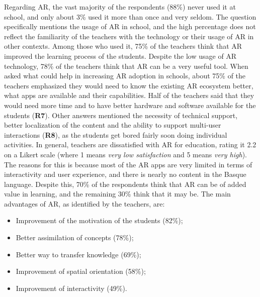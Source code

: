 Regarding AR, the vast majority of the respondents (88\%) never used it at school, and only about 3\% used it more than once and very seldom. The question specifically mentions the usage of AR in school, and the high percentage does not reflect the familiarity of the teachers with the technology or their usage of AR in other contexts. Among those who used it, 75\% of the teachers think that AR improved the learning process of the students. Despite the low usage of AR technology, 78\% of the teachers think that AR can be a very useful tool. When asked what could help in increasing AR adoption in schools, about 75\% of the teachers emphasized they would need to know the existing AR ecosystem better, what apps are available and their capabilities. Half of the teachers said that they would need more time and to have better hardware and software available for the students (\textbf{R7}). Other answers mentioned the necessity of technical support, better localization of the content and the ability to support multi-user interactions (\textbf{R8}), as the students get bored fairly soon doing individual activities. In general, teachers are dissatisfied with AR for education, rating it 2.2 on a Likert scale (where 1 means \textit{very low satisfaction} and 5 means \textit{very high}). The reasons for this is because most of the AR apps are very limited in terms of interactivity and user experience, and there is nearly no content in the Basque language. Despite this, 70\% of the respondents think that AR can be of added value in learning, and the remaining 30\% think that it may be. The main advantages of AR, as identified by the teachers, are:
\begin{itemize}
        \item Improvement of the motivation of the students (82\%);
        \item Better assimilation of concepts (78\%);
        \item Better way to transfer knowledge (69\%);
        \item Improvement of spatial orientation (58\%);
        \item Improvement of interactivity (49\%).
\end{itemize}

